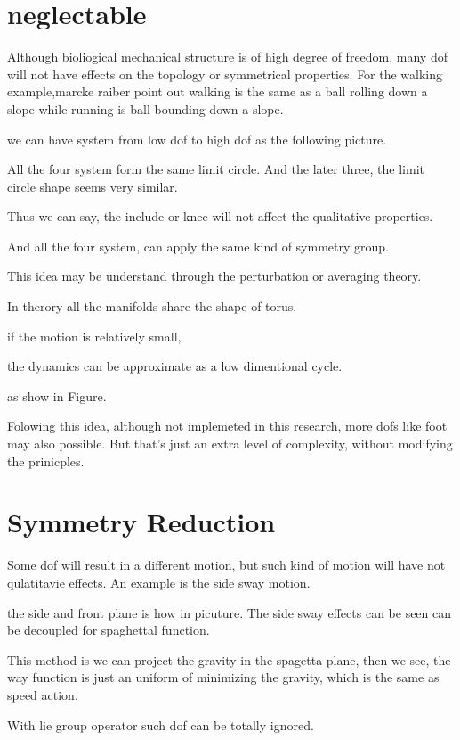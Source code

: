 \section{neglectable}
Although bioliogical mechanical structure is of high degree of freedom, many dof will not have effects on the topology or symmetrical properties.
For the walking example,marcke raiber point out walking is the same as a ball rolling down a slope while running is ball bounding down a slope.


we can have system from low dof to high dof as the following picture.
\begin{itemize}
\end{itemize}

All the four system form the same limit circle.
And the later three, the limit circle shape seems very similar.

Thus we can say, the include or knee will not affect the qualitative properties.


And all the four system, can apply the same kind of symmetry group.


This idea may be understand through the perturbation or averaging theory.

In therory all the manifolds share the shape of torus.

if the motion is relatively small,

the dynamics can be approximate as a low dimentional cycle.

as show in Figure.


Folowing this idea, although not implemeted in this research, more dofs like foot may also possible.
But that's just an extra level of complexity, without modifying the prinicples. 
\section{Symmetry Reduction}
Some dof will result in a different motion, but such kind of motion will have not qulatitavie effects.
An example is the side sway motion.

the side and front plane is how in picuture.
The side sway effects can be seen can be decoupled for spaghettal function.

This method is we can project the gravity in the spagetta plane,
then we see, the way function is just an uniform of minimizing the gravity,
which is the same as speed action.

With lie group operator such dof can be totally ignored.


